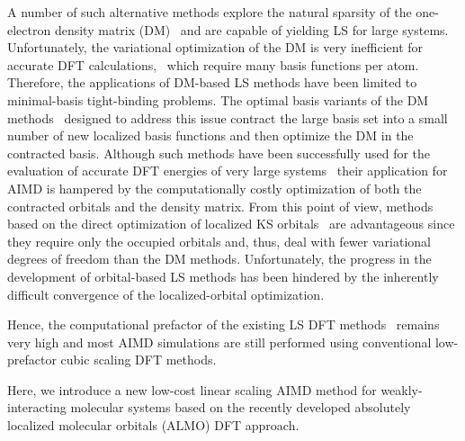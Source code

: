 \documentclass[10pt,aps,prl,twocolumn,amsmath,amssymb,superscriptaddress,longbibliography]{revtex4-1}
\begin{document}
A number of such alternative methods explore the natural sparsity of the one-electron density matrix (DM)~\cite{a:ls-kohn-1996,a:ls-rev-1999} and are capable of yielding LS for large systems.~\cite{a:linscale3,a:lee-yang-1996,a:ls-scuseria-1997,a:ls-manolopoulos-1998,a:ls-helgaker-2001,a:ls-niklasson-2003,a:curvy2,a:ls-dm-sign} 
Unfortunately, the variational optimization of the DM is very inefficient for accurate DFT calculations,~\cite{a:ls-rev-1999,a:ls-dm-sign} which require many basis functions per atom. 
Therefore, the applications of DM-based LS methods have been limited to minimal-basis tight-binding problems. 
The optimal basis variants of the DM methods~\cite{a:ls-stechel-1994,a:ls-gillan-1995,a:ls-gillan-1996,a:ls-onetep-2003} designed to address this issue contract the large basis set into a small number of new localized basis functions and then optimize the DM in the contracted basis. 
Although such methods have been successfully used for the evaluation of accurate DFT energies of very large systems~\cite{a:ls-onetep-2009,a:ls-conquest-2010,a:ls-onetep-2010-app1,a:ls-rev-2012} their application for AIMD is hampered by the computationally costly optimization of both the contracted orbitals and the density matrix.
%
From this point of view, methods based on the direct optimization of localized KS orbitals~\cite{a:ls-galli-parrinello-1992,a:ls-mauri-galli-car-1993,a:ls-ordejon-1993,a:ls-mauri-galli-1994,a:ls-ordejon-1995,a:ls-kim-mauri-galli-1995,a:ls-fattebert-2004,a:ls-fattebert-2006,a:burger-yang-2008} are advantageous since they require only the occupied orbitals and, thus, deal with fewer variational degrees of freedom than the DM methods. 
Unfortunately, the progress in the development of orbital-based LS methods has been hindered by the inherently difficult convergence of the localized-orbital optimization.~\cite{a:ls-mauri-galli-car-1993,a:ls-ordejon-1995,a:ls-fattebert-2004,a:ls-rev-1999,a:weitao-yang-2013} 

Hence, the computational prefactor of the existing LS DFT methods~\cite{a:ls-rev-1995,a:ls-rev-1999,a:ls-rev-2002,a:ls-rev-2012} remains very high and most AIMD simulations are still performed using conventional low-prefactor cubic scaling DFT methods.

Here, we introduce a new low-cost linear scaling AIMD method for weakly-interacting molecular systems based on the recently developed absolutely localized molecular orbitals (ALMO) DFT approach.~\cite{a:almo-ls} 
\end{document}
